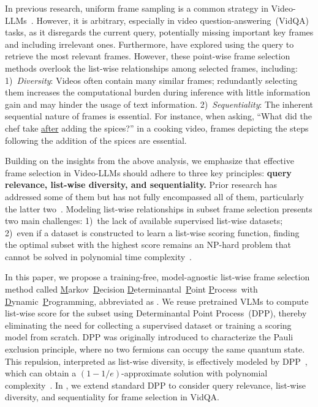 In previous research, uniform frame sampling is a common strategy in Video-LLMs~\cite{miao2023towards,lin2023video,zhang2024video,wang2024internvideo2}. 
However, it is arbitrary, especially in video question-answering~(VidQA) tasks, 
as it disregards the current query, potentially missing important key frames and including irrelevant ones. 
Furthermore, \citet{liang2024keyvideollm,wang2024weakly,yu2024self} have explored using the query to retrieve the most relevant frames.
However, these point-wise frame selection methods overlook the list-wise relationships among selected frames, including: 
1)~\emph{Diversity}: Videos often contain many similar frames; redundantly selecting them increases the computational burden during inference with little information gain and may hinder the usage of text information.
2)~\emph{Sequentiality}: The inherent sequential nature of frames is essential. 
For instance, when asking, ``What did the chef take \underline{after} adding the spices?'' in a cooking video, frames depicting the steps following the addition of the spices are essential.



Building on the insights from the above analysis, we emphasize that effective frame selection in Video-LLMs should adhere to three key principles:
\textbf{query relevance, list-wise diversity, and sequentiality.} 
Prior research has addressed some of them but has not fully encompassed all of them, particularly the latter two~\cite{jin2024chat,wang2025ViLA,tang2025,hu2025m}.
Modeling list-wise relationships in subset frame selection presents two main challenges:
1)~the lack of available supervised list-wise datasets; 
2)~even if a dataset is constructed to learn a list-wise scoring function, finding the optimal subset with the highest score remains an NP-hard problem that cannot be solved in polynomial time complexity~\cite{bian2020efficient,chen2018fast}.



In this paper, we propose a training-free, model-agnostic list-wise frame selection method called 
\underline{M}arkov~\underline{D}ecision \underline{D}eterminantal~\underline{P}oint \underline{P}rocess~with \underline{D}ynamic~\underline{P}rogramming, abbreviated as \mname{}.
We reuse pretrained VLMs to compute list-wise score for the subset using Determinantal Point Process~(DPP), 
thereby eliminating the need for collecting a supervised dataset or training a scoring model from scratch.
DPP was originally introduced to characterize the Pauli exclusion principle, where no two fermions can occupy the same quantum state.
This repulsion, interpreted as list-wise diversity, is effectively modeled by DPP~\cite{macchi1975coincidence},
which can obtain a $(1-1/e)$-approximate solution with polynomial complexity~\cite{chen2018fast}.
%
In \mname{}, we extend standard DPP to consider query relevance, list-wise diversity, and sequentiality for frame selection in VidQA.



